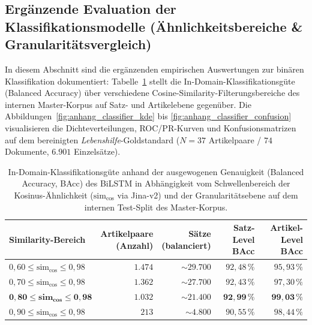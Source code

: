 \newpage
\subsection{Ergänzende Evaluation der Klassifikationsmodelle (Ähnlichkeitsbereiche \& Granularitätsvergleich)}
\label{sec:anhang_klassifikatoren}

In diesem Abschnitt sind die ergänzenden empirischen Auswertungen zur binären Klassifikation dokumentiert: Tabelle~\ref{tab:sweet_spot_ablation_klassifikation} stellt die In-Domain-Klassifikationsgüte (Balanced Accuracy) über verschiedene Cosine-Similarity-Filterungsbereiche des internen Master-Korpus auf Satz- und Artikelebene gegenüber. Die Abbildungen~\ref{fig:anhang_classifier_kde} bis \ref{fig:anhang_classifier_confusion} visualisieren die Dichteverteilungen, ROC/PR-Kurven und Konfusionsmatrizen auf dem bereinigten \textit{Lebenshilfe}-Goldstandard ($N = 37$ Artikelpaare / $74$ Dokumente, $6.901$ Einzelsätze).

\begin{table}[htbp]
\centering
\small
\caption[In-Domain-Klassifikationsgüte über Similarity-Bereiche]{In-Domain-Klassifikationsgüte anhand der ausgewogenen Genauigkeit (Balanced Accuracy, BAcc) des BiLSTM in Abhängigkeit vom Schwellenbereich der Kosinus-Ähnlichkeit ($\text{sim}_{\cos}$ via Jina-v2) und der Granularitätsebene auf dem internen Test-Split des Master-Korpus.}
\label{tab:sweet_spot_ablation_klassifikation}
\begin{tabular}{@{}lrrrr@{}}
\toprule
\textbf{Similarity-Bereich} & \shortstack[r]{\textbf{Artikelpaare}\\\textbf{(Anzahl)}} & \shortstack[r]{\textbf{Sätze}\\\textbf{(balanciert)}} & \shortstack[r]{\textbf{Satz-Level}\\\textbf{BAcc}} & \shortstack[r]{\textbf{Artikel-Level}\\\textbf{BAcc}} \\
\midrule
$0{,}60 \le \text{sim}_{\cos} \le 0{,}98$ & $1.474$ & $\sim 29.700$ & $92{,}48\,\%$ & $95{,}93\,\%$ \\
$0{,}70 \le \text{sim}_{\cos} \le 0{,}98$ & $1.362$ & $\sim 27.700$ & $92{,}43\,\%$ & $97{,}30\,\%$ \\
$\mathbf{0{,}80 \le \text{sim}_{\cos} \le 0{,}98}$ & $\mathbf{1.032}$ & $\mathbf{\sim 21.400}$ & $\mathbf{92{,}99\,\%}$ & $\mathbf{99{,}03\,\%}$ \\
$0{,}90 \le \text{sim}_{\cos} \le 0{,}98$ & $213$ & $\sim 4.800$ & $90{,}55\,\%$ & $98{,}44\,\%$ \\
\bottomrule
\end{tabular}
\end{table}

